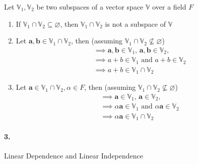 \documentclass[12pt, letterpaper]{article}
\begin{document}
Let $\mathbb{V}_1, \mathbb{V}_2$ be two subspaces of a vector space $\mathbb{V}$ over a field $F$
\begin{enumerate}
  \item If $\mathbb{V}_1 \cap \mathbb{V}_2 \subseteq \varnothing$,
  then $\mathbb{V}_1 \cap \mathbb{V}_2$ is not a subspace of $\mathbb{V}$

  \item Let $\mathbf{a},\mathbf{b} \in \mathbb{V}_1 \cap \mathbb{V}_2$, then
  (assuming $\mathbb{V}_1 \cap \mathbb{V}_2 \not\subseteq \varnothing$)\\
  \[
    \begin{split}
    &\implies \mathbf{a},\mathbf{b} \in \mathbb{V}_1,\,
    \mathbf{a},\mathbf{b} \in \mathbb{V}_2,\,\\
    &\implies a + b \in \mathbb{V}_1\text{ and }a + b \in \mathbb{V}_2\\
    &\implies \boxed{a + b \in \mathbb{V}_1 \cap \mathbb{V}_2}
    \end{split}
  \]

  \item Let $\mathbf{a} \in \mathbb{V}_1 \cap \mathbb{V}_2, \alpha \in F$, then
  (assuming $\mathbb{V}_1 \cap \mathbb{V}_2 \not\subseteq \varnothing$)
  \[
    \begin{split}
    &\implies \mathbf{a} \in \mathbb{V}_1,\,
    \mathbf{a} \in \mathbb{V}_2,\,\\
    &\implies \alpha\mathbf{a} \in \mathbb{V}_1\text{ and }\alpha\mathbf{a} \in \mathbb{V}_2\\
    &\implies \boxed{\alpha\mathbf{a} \in \mathbb{V}_1 \cap \mathbb{V}_2}
    \end{split}
  \]
\end{enumerate}


\pagebreak
\paragraph{3.} Linear Dependence and Linear Independence
\end{document}
